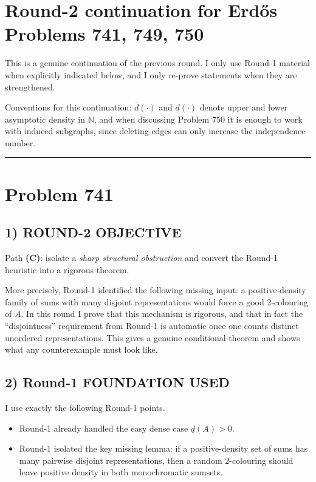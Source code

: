 \section*{Round-2 continuation for Erd\H{o}s Problems 741, 749, 750}

\noindent
This is a genuine continuation of the previous round. I only use Round-1 material when explicitly indicated below, and I only re-prove statements when they are strengthened.

\medskip
\noindent
Conventions for this continuation: $\overline d(\cdot)$ and $\underline d(\cdot)$ denote upper and lower asymptotic density in $\mathbb N$, and when discussing Problem 750 it is enough to work with induced subgraphs, since deleting edges can only increase the independence number.


\bigskip
\hrule
\bigskip

\section*{Problem 741}

\subsection*{1) ROUND-2 OBJECTIVE}

Path \textbf{(C)}: isolate a \emph{sharp structural obstruction} and convert the Round-1 heuristic into a rigorous theorem.

More precisely, Round-1 identified the following missing input: a positive-density family of sums with many disjoint representations would force a good 2-colouring of $A$. In this round I prove that this mechanism is rigorous, and that in fact the ``disjointness'' requirement from Round-1 is automatic once one counts distinct unordered representations. This gives a genuine conditional theorem and shows what any counterexample must look like.

\subsection*{2) Round-1 FOUNDATION USED}

I use exactly the following Round-1 points.

\begin{itemize}
\item Round-1 already handled the easy dense case $\underline d(A)>0$.
\item Round-1 isolated the key missing lemma: if a positive-density set of sums has many pairwise disjoint representations, then a random 2-colouring should leave positive density in both monochromatic sumsets.
\end{itemize}

